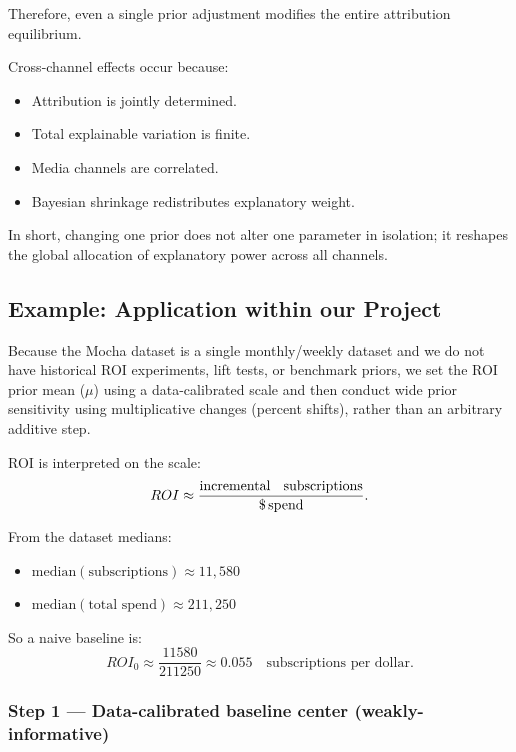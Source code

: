 \documentclass{article}
\begin{document}
Therefore, even a single prior adjustment
modifies the entire attribution equilibrium.

Cross-channel effects occur because:

\begin{itemize}
\item Attribution is jointly determined.
\item Total explainable variation is finite.
\item Media channels are correlated.
\item Bayesian shrinkage redistributes explanatory weight.
\end{itemize}

In short,
changing one prior does not alter one parameter in isolation;
it reshapes the global allocation of explanatory power
across all channels.

\subs

\subsection{Example: Application within our Project}

Because the Mocha dataset is a single monthly/weekly dataset and we do not have historical ROI experiments, lift tests, or benchmark priors, we set the ROI prior mean ($\mu$) using a data-calibrated scale and then conduct wide prior sensitivity using multiplicative changes (percent shifts), rather than an arbitrary additive step.

ROI is interpreted on the scale:
\[
ROI \approx \frac{\text{incremental \; subscriptions}}{\$\,\text{spend}}.
\]

From the dataset medians:
\begin{itemize}
  \item $\mathrm{median}(\text{subscriptions}) \approx 11{,}580$
  \item $\mathrm{median}(\text{total spend}) \approx 211{,}250$
\end{itemize}

So a naive baseline is:
\[
ROI_0 \approx \frac{11580}{211250} \approx 0.055
\quad \text{subscriptions per dollar.}
\]

\subsubsection*{Step 1 --- Data-calibrated baseline center (weakly-informative)}
\end{document}

